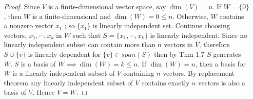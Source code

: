 \begin{proof}
	Since $V$ is a finite-dimensional vector space, say $\dim(V) = n$. If $W = \{0\}$, then $W$ is a finite-dimensional and $\dim(W) = 0 \leq n$. Otherwise, $W$ contains a nonzero vector $x_1$ ; so $\{x_1\}$ is linearly independent set. Continue choosing vectors, $x_1,\cdots,x_k $ in $W$ such that $S = \{x_1,\cdots,x_k\}$ is linearly independent. Since no linearly independent subset can contain more than $n$ vectors in $V$, therefore $S \cup \{v\}$ is linearly dependent for $\{v\}\in span(S)$ then by Thm 1.7 $S$ generates $W$. $S$ is a basis of $W \implies \dim(W) = k \leq n$. If $\dim(W) = n$, then a basis for $W$ is a linearly independent subset of $V$ containing $n$ vectors. By replacement theorem any linearly independent subset of $V$ contains exactly $n$ vectors is also a basis of $V$. Hence $V = W$.  
\end{proof}  